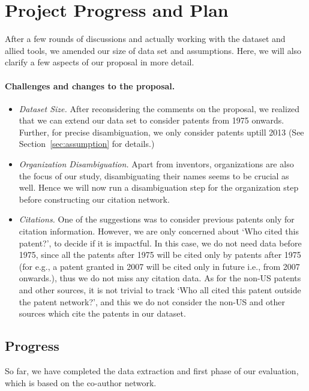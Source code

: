 \section{Project Progress and Plan}
\label{sec:changes}
After a few rounds of discussions and actually working with the dataset and
 allied tools, we amended our  size of data set and  assumptions. Here, we
will also clarify a few aspects of our proposal in more detail.

\paragraph{Challenges and changes to the proposal.}

	\begin{itemize}
		\squish
		\item {\em Dataset Size.} After reconsidering the comments on the proposal, 
		we realized that
		we can extend our data set to consider patents from 1975 onwards. Further,
		for precise disambiguation, we only consider patents uptill 2013 (See
		Section~\ref{sec:assumption} for details.)
		\item {\em Organization Disambiguation.} Apart from inventors, organizations are also the focus of
		our study, disambiguating their names seems to be crucial as well. Hence we will
		now run a disambiguation step for the organization step before constructing
		our citation network.
		\item {\em Citations.} One of the suggestions was to consider previous patents
		only for citation information. However, we are only concerned about `Who
		cited this patent?', to decide if it is impactful. In this case, we do not
		need data before 1975, since all the patents after 1975 will be cited only by
		patents after 1975 (for e.g., a patent granted in 2007 will be cited only in
		future i.e., from 2007 onwards.), thus we do not miss any citation data. As
		for the non-US patents and other sources, it is not trivial to track `Who all
		cited this patent outside the patent network?', and this we do not consider
		the non-US and other sources which cite the patents in our dataset.

	\end{itemize}


\subsection{Progress}
\label{sec:progress}
So far, we have completed the data extraction and first phase of our
evaluation, which is based on the co-author network. 

